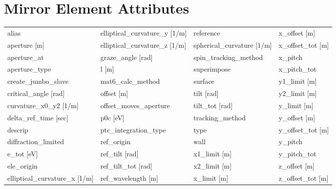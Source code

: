  \section{Mirror Element Attributes}
 \label{s:list.mirror}

 \begin{tabular}{llll} \toprule
alias                          & elliptical_curvature_y [1/m]   & reference                      & x_offset [m]                   \\
aperture [m]                   & elliptical_curvature_z [1/m]   & spherical_curvature [1/m]      & x_offset_tot [m]               \\
aperture_at                    & graze_angle [rad]              & spin_tracking_method           & x_pitch                        \\
aperture_type                  & l [m]                          & superimpose                    & x_pitch_tot                    \\
create_jumbo_slave             & mat6_calc_method               & surface                        & y1_limit [m]                   \\
critical_angle [rad]           & offset [m]                     & tilt [rad]                     & y2_limit [m]                   \\
curvature_x0_y2 [1/m]          & offset_moves_aperture          & tilt_tot [rad]                 & y_limit [m]                    \\
delta_ref_time [sec]           & p0c [eV]                       & tracking_method                & y_offset [m]                   \\
descrip                        & ptc_integration_type           & type                           & y_offset_tot [m]               \\
diffraction_limited            & ref_origin                     & wall                           & y_pitch                        \\
e_tot [eV]                     & ref_tilt [rad]                 & x1_limit [m]                   & y_pitch_tot                    \\
ele_origin                     & ref_tilt_tot [rad]             & x2_limit [m]                   & z_offset [m]                   \\
elliptical_curvature_x [1/m]   & ref_wavelength [m]             & x_limit [m]                    & z_offset_tot [m]               \\
 \bottomrule
 \end{tabular}
 \vfill

